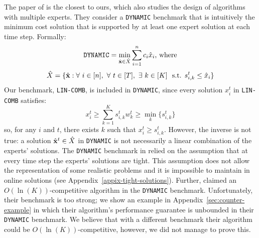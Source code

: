 The paper of \cite{AnandGe22:Online-Algorithms} is the closest to ours, which also studies the design of algorithms with multiple experts.
They consider a \texttt{DYNAMIC} benchmark that is intuitively
the minimum cost solution that is supported by at least one expert solution at each time step. Formally:
\[\texttt{DYNAMIC} = \min_{\hat{\textbf{x}} \in \hat{X}} \sum_{i=1}^{n} c_i \hat{x}_i \textnormal{, where}\]
%
\[\hat{X} = \{\hat{\mathbf{x}} : \forall\ i \in [n],\ \forall\ t \in [T],\ \exists\ k \in [K]\ \textnormal{ s.t. } s_{i,k}^{t} \le \hat{x}_i \}\]
%
Our benchmark, \texttt{LIN-COMB}, is included in \texttt{DYNAMIC}, since every solution $x_{i}^{t}$ in \texttt{LIN-COMB} satisfies:
\[
	x_{i}^{t} \geq \sum_{k=1}^{K} s_{i,k}^{t}w_{k}^{t} \geq \min_{k} \{s_{i,k}^{t}\}
\]
so, for any $i$ and $t$, there exists $k$ such that $x_{i}^{t} \geq s_{i,k}^{t}$.
However, the inverse is not true: a solution $\hat{\mathbf{x}}^{t} \in \hat{X}$ in \texttt{DYNAMIC} is not necessarily
a linear combination of the experts' solutions.
The \texttt{DYNAMIC} benchmark in \cite{AnandGe22:Online-Algorithms} relied on the assumption that at every time step
the experts' solutions are tight. This assumption does not allow the representation of some realistic problems and it is impossible to maintain in online solutions (see Appendix~\ref{appix-tight-solutions}).
Further, \cite{AnandGe22:Online-Algorithms} claimed an $O(\ln(K))$-competitive algorithm in the \texttt{DYNAMIC} benchmark.
Unfortunately, their benchmark is too strong; we show an example in Appendix~\ref{sec:counter-example}
in which their algorithm's performance guarantee is unbounded in their \texttt{DYNAMIC}
benchmark. We believe that with a different benchmark their algorithm could be $O(\ln(K))$-competitive, however, we did not manage to prove this.


